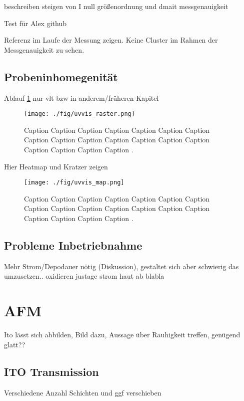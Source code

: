 beschreiben steigen von I null
größenordnung und dmait messgenauigkeit

Test für Alex github





Referenz im Laufe der Messung zeigen.
Keine Cluster im Rahmen der Messgenauigkeit zu sehen.

\subsection{Probeninhomegenität}

Ablauf \ref{fig:uvvis_raster} nur vlt bzw in anderem/früheren Kapitel
\blindtext
\begin{figure}
    \centering
    \texttt{[image: ./fig/uvvis\_raster.png]}
    \caption{Caption Caption Caption Caption Caption Caption Caption Caption Caption Caption Caption Caption Caption Caption Caption Caption Caption Caption .}
    \label{fig:uvvis_raster}
\end{figure}

\blindtext
Hier Heatmap und Kratzer zeigen
\blindtext
\begin{figure}
    \centering
    \texttt{[image: ./fig/uvvis\_map.png]}
    \caption{Caption Caption Caption Caption Caption Caption Caption Caption Caption Caption Caption Caption Caption Caption Caption Caption Caption Caption .}
    \label{fig:uvvis_map}
\end{figure}
\blindtext
\subsection{Probleme Inbetriebnahme}
Mehr Strom/Depodauer nötig (Diskussion), gestaltet sich aber schwierig das umzusetzen.. oxidieren justage strom haut ab blabla
\section{AFM}
Ito lässt sich abbilden, Bild dazu, Aussage über Rauhigkeit treffen, genügend glatt?? \

\blindmathpaper

\subsection{ITO Transmission}

Verschiedene Anzahl Schichten und ggf verschieben
